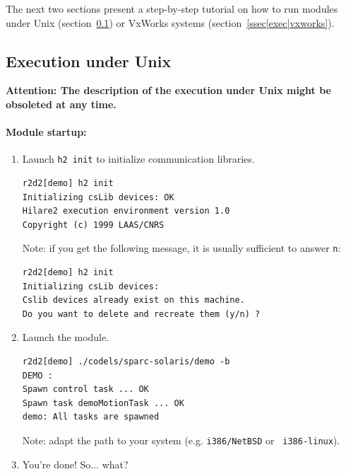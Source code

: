 The   next two sections   present a step-by-step   tutorial on how to run
modules under   Unix  (section~\ref{ssec|exec|unix}) or   VxWorks systems
(section~\ref{ssec|exec|vxworks}).

\subsection{Execution under Unix}
\label{ssec|exec|unix}

{\bf  Attention:  The description of  the execution   under Unix might be
obsoleted at any time.}

\paragraph{Module startup:}

\begin{enumerate}
\item Launch {\tt h2 init} to initialize communication libraries.

\begin{center}\begin{cartouche}\small\begin{verbatim}
r2d2[demo] h2 init
Initializing csLib devices: OK
Hilare2 execution environment version 1.0
Copyright (c) 1999 LAAS/CNRS
\end{verbatim}\end{cartouche}\end{center}

Note: if you get the following message, it is usually sufficient to
answer {\tt n}:

\begin{center}\begin{cartouche}\small\begin{verbatim}
r2d2[demo] h2 init
Initializing csLib devices: 
Cslib devices already exist on this machine.
Do you want to delete and recreate them (y/n) ?
\end{verbatim}\end{cartouche}\end{center}

\item Launch the module.

\begin{center}\begin{cartouche}\small\begin{verbatim}
r2d2[demo] ./codels/sparc-solaris/demo -b
DEMO :
Spawn control task ... OK
Spawn task demoMotionTask ... OK
demo: All tasks are spawned
\end{verbatim}\end{cartouche}\end{center}

Note:  adapt  the path  to your system   (e.g. {\tt  i386/NetBSD} or {\tt
i386-linux}).

\item You're done! So... what?
\end{enumerate}

